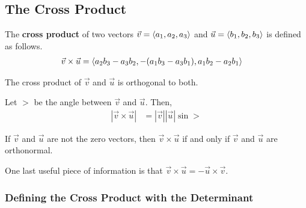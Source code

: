 \subsection{The Cross Product}
\begin{definition}
    The \textbf{cross product} of two vectors $\vec{v} = \langle a_1, a_2, a_3 \rangle$ and $\vec{u} = \langle b_1, b_2, b_3 \rangle$ is defined as follows.
    \begin{align*}
        \vec{v} \times \vec{u} &= \langle a_2 b_3 - a_3 b_2, - (a_1 b_3 - a_3 b_1), a_1 b_2 - a_2 b_1 \rangle
    \end{align*}
\end{definition}
\begin{thm}
    The cross product of $\vec{v}$ and $\vec{u}$ is orthogonal to both.
\end{thm}

\begin{thm}
    Let $\gt$ be the angle between $\vec{v}$ and $\vec{u}$. Then,
    \begin{align*}
        | \vec{v} \times \vec{u} | &= | \vec{v} | | \vec{u} | \sin \gt
    \end{align*}
\end{thm}

\begin{corollary}
    If $\vec{v}$ and $\vec{u}$ are not the zero vectors, then $\vec{v} \times \vec{u}$ if and only if $\vec{v}$ and $\vec{u}$ are orthonormal.
\end{corollary}

One last useful piece of information is that $\vec{v} \times \vec{u} = - \vec{u} \times \vec{v}$.

\subsubsection{Defining the Cross Product with the Determinant}


